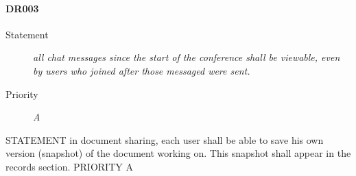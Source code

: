 \paragraph{DR003}
\begin{description}
  \item [Statement] 
  \textit{ all chat messages since the start of the conference shall be viewable, even by users who joined after those messaged were sent.}
\item [Priority] \textit{A}
\end{description}


STATEMENT in  document sharing, each user shall be able to save his own version (snapshot) of the document working on.
          This snapshot shall appear in the records section.
PRIORITY A
